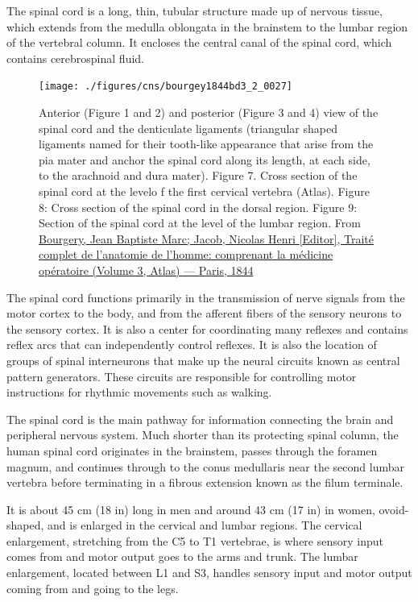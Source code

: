 The spinal cord is a long, thin, tubular structure made up of nervous tissue, which extends from the medulla oblongata in the brainstem to the lumbar region of the vertebral column. It encloses the central canal of the spinal cord, which contains cerebrospinal fluid.



\begin{figure}

{\centering \texttt{[image: ./figures/cns/bourgey1844bd3\_2\_0027]} 

}

\caption{Anterior (Figure 1 and 2) and posterior (Figure 3 and 4) view of the spinal cord and the denticulate ligaments (triangular shaped ligaments named for their tooth-like appearance that arise from the pia mater and anchor the spinal cord along its length, at each side, to the arachnoid and dura mater). Figure 7. Cross section of the spinal cord at the levelo f the first cervical vertebra (Atlas). Figure 8: Cross section of the spinal cord in the dorsal region. Figure 9: Section of the spinal cord at the level of the lumbar region. From \href{https://digi.ub.uni-heidelberg.de/diglit/bourgey1844bd3_2}{Bourgery, Jean Baptiste Marc; Jacob, Nicolas Henri {[}Editor{]}, Traité complet de l'anatomie de l'homme: comprenant la médicine opératoire (Volume 3, Atlas) --- Paris, 1844}}\label{fig:spinalcordanatomy}
\end{figure}

The spinal cord functions primarily in the transmission of nerve signals from the motor cortex to the body, and from the afferent fibers of the sensory neurons to the sensory cortex. It is also a center for coordinating many reflexes and contains reflex arcs that can independently control reflexes. It is also the location of groups of spinal interneurons that make up the neural circuits known as central pattern generators. These circuits are responsible for controlling motor instructions for rhythmic movements such as walking.

The spinal cord is the main pathway for information connecting the brain and peripheral nervous system. Much shorter than its protecting spinal column, the human spinal cord originates in the brainstem, passes through the foramen magnum, and continues through to the conus medullaris near the second lumbar vertebra before terminating in a fibrous extension known as the filum terminale.

It is about 45 cm (18 in) long in men and around 43 cm (17 in) in women, ovoid-shaped, and is enlarged in the cervical and lumbar regions. The cervical enlargement, stretching from the C5 to T1 vertebrae, is where sensory input comes from and motor output goes to the arms and trunk. The lumbar enlargement, located between L1 and S3, handles sensory input and motor output coming from and going to the legs.



